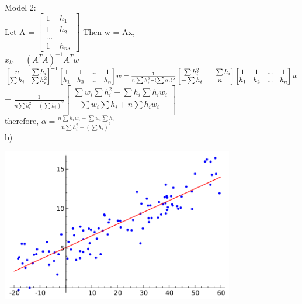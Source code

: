 \documentclass[11pt]{article}
\begin{document}
Model 2:\\
Let A = $\begin{bmatrix}
	1 & h_1\\1 &h_2 \\ ...\\ 1 & h_n, 
\end{bmatrix}$ Then w = Ax,\\
 $x_{ls} = (A^TA)^{-1}A^Tw$ = $\begin{bmatrix}
 	n& \sum h_i \\ \sum h_i & \sum h_i^2 
 \end{bmatrix}^{-1} \begin{bmatrix}
 1&1& ... &1\\ h_1 &h_2&...& h_n
 \end{bmatrix} w \\= \frac{1}{n\sum h_i^2 - (\sum h_i)^2}
\begin{bmatrix}
\sum h_i^2 &- \sum h_i \\ -\sum h_i & n
\end{bmatrix} \begin{bmatrix}
1&1& ... &1\\ h_1 &h_2&...& h_n
\end{bmatrix}w$\\
= $\frac{1}{n\sum h_i^2 - (\sum h_i)^2} \begin{bmatrix}
\sum w_i \sum h_i^2 - \sum h_i \sum h_iw_i\\
-\sum w_i \sum h_i + n\sum h_i w_i\\
\end{bmatrix}$\\
therefore, $\alpha = \frac{n\sum h_i w_i -\sum w_i \sum h_i }{n\sum h_i^2 - (\sum h_i)^2}$\\


b)

\begin{centering}
\includegraphics[width = 4in]{q3}\\
\end{centering}
\end{document}
